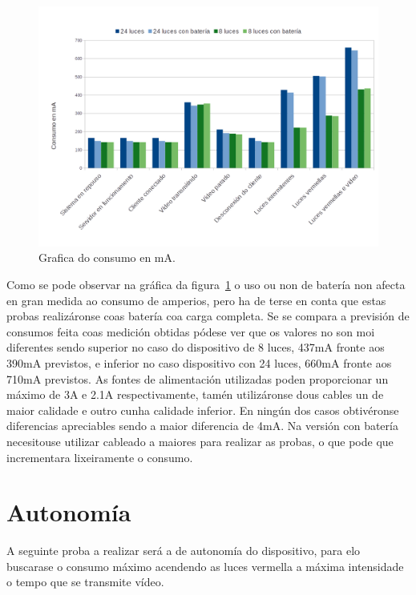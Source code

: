 \begin{figure}[tb]
  \centering
  \includegraphics[scale=.5]{imaxes/grafica-amperaxe.png}
  \caption{Grafica do consumo en mA.}
  \label{fig:amperaxe}
\end{figure}
Como se pode observar na gráfica da figura~\ref{fig:amperaxe} o uso ou non de batería non afecta en gran medida ao consumo de amperios, pero ha de terse en conta que estas probas realizáronse coas batería coa carga completa. Se se compara a previsión de consumos feita coas medición obtidas
pódese ver que os valores no son moi diferentes sendo superior no caso do dispositivo de 8 luces, 437mA fronte aos 390mA previstos, e inferior no caso dispositivo con 24 luces, 660mA fronte aos 710mA previstos.
As fontes de alimentación utilizadas poden proporcionar un máximo de 3A e 2.1A respectivamente, tamén utilizáronse dous cables un de maior calidade e outro cunha calidade inferior. En ningún dos casos obtivéronse diferencias apreciables sendo a maior diferencia de 4mA. Na versión con batería necesitouse utilizar cableado a maiores para realizar as probas, o que pode que incrementara lixeiramente o consumo.

\section{Autonomía}

A seguinte proba a realizar será a de autonomía do dispositivo, para elo buscarase o consumo máximo acendendo as luces vermella a máxima intensidade o tempo que se transmite vídeo.


